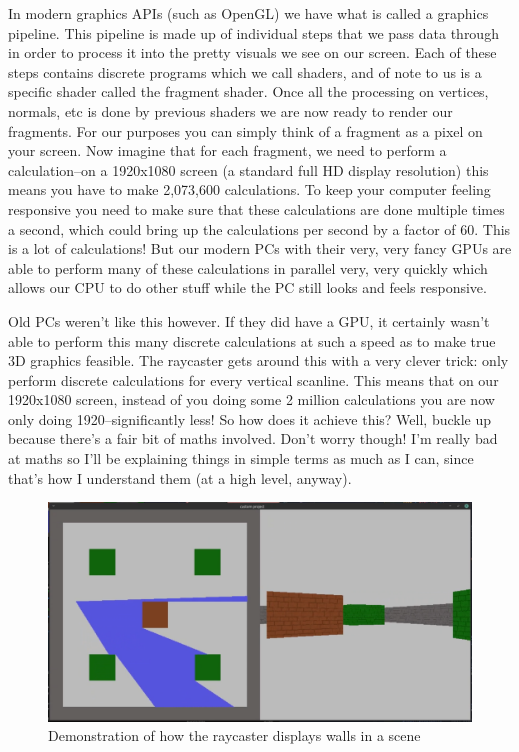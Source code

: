 \documentclass{article}
\begin{document}
In modern graphics APIs (such as OpenGL) we have what is called a graphics
pipeline. This pipeline is made up of individual steps that we pass data through
in order to process it into the pretty visuals we see on our screen. Each of
these steps contains discrete programs which we call shaders, and of note to us
is a specific shader called the fragment shader. Once all the processing on
vertices, normals, etc is done by previous shaders we are now ready to render
our fragments. For our purposes you can simply think of a fragment as a pixel on
your screen. Now imagine that for each fragment, we need to perform a
calculation--on a 1920x1080 screen (a standard full HD display resolution) this
means you have to make 2,073,600 calculations. To keep your computer feeling
responsive you need to make sure that these calculations are done multiple times
a second, which could bring up the calculations per second by a factor of 60.
This is a lot of calculations! But our modern PCs with their very, very fancy
GPUs are able to perform many of these calculations in parallel very, very
quickly which allows our CPU to do other stuff while the PC still looks and
feels responsive.

Old PCs weren't like this however. If they did have a GPU, it certainly wasn't
able to perform this many discrete calculations at such a speed as to make true
3D graphics feasible. The raycaster gets around this with a very clever trick:
only perform discrete calculations for every vertical scanline. This means that
on our 1920x1080 screen, instead of you doing some 2 million calculations you
are now only doing 1920--significantly less! So how does it achieve this? Well,
buckle up because there's a fair bit of maths involved. Don't worry though! I'm
really bad at maths so I'll be explaining things in simple terms as much as I
can, since that's how I understand them (at a high level, anyway).

\begin{figure}
\centering
\includegraphics[scale=0.3]{raycaster1.png}
\caption{Demonstration of how the raycaster displays walls in a scene}
\end{figure}
\end{document}
